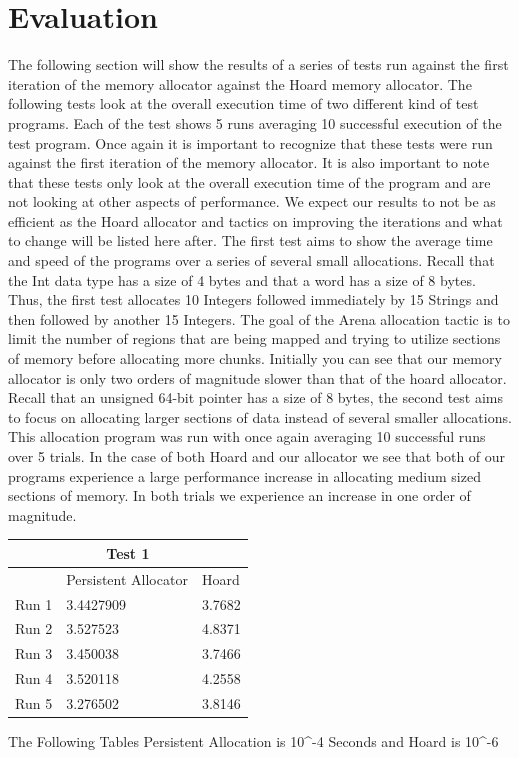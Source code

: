 \documentclass[conference]{IEEEtran}
\begin{document}
\section{Evaluation}
The following section will show the results of a series of tests run against the first iteration of the memory allocator against the Hoard memory allocator. The following tests look at the overall execution time of two different kind of test programs. Each of the test shows 5 runs averaging 10 successful execution of the test program. Once again it is important to recognize that these tests were run against the first iteration of the memory allocator. It is also important to note that these tests only look at the overall execution time of the program and are not looking at other aspects of performance. We expect our results to not be as efficient as the Hoard allocator and tactics on improving the iterations and what to change will be listed here after. The first test aims to show the average time and speed of the programs over a series of several small allocations. Recall that the Int data type has a size of 4 bytes and that a word has a size of 8 bytes. Thus, the first test allocates 10 Integers followed immediately by 15 Strings and then followed by another 15 Integers. The goal of the Arena allocation tactic is to limit the number of regions that are being mapped and trying to utilize sections of memory before allocating more chunks. Initially you can see that our memory allocator is only two orders of magnitude slower than that of the hoard allocator. Recall that an unsigned 64-bit pointer has a size of 8 bytes, the second test aims to focus on allocating larger sections of data instead of several smaller allocations. This allocation program was run with once again averaging 10 successful runs over 5 trials. In the case of both Hoard and our allocator we see that both of our programs experience a large performance increase in allocating medium sized sections of memory. In both trials we experience an increase in one order of magnitude.  



\begin{tabular}{ |p{1cm}||p{3cm}|p{3cm}|  }
 \hline
 \multicolumn{3}{|c|}{Test 1} \\
 \hline
 & Persistent Allocator & Hoard \\
 \hline
 Run 1   &3.4427909    &3.7682\\
 Run 2&   3.527523  & 4.8371   \\
 Run 3 &3.450038 & 3.7466  \\
 Run 4& 3.520118& 4.2558\\
 Run 5&   3.276502  &3.8146\\
 \hline
\end{tabular}
 The Following Tables Persistent Allocation is 10^-4 Seconds and Hoard is 10^-6
\\
\end{document}
